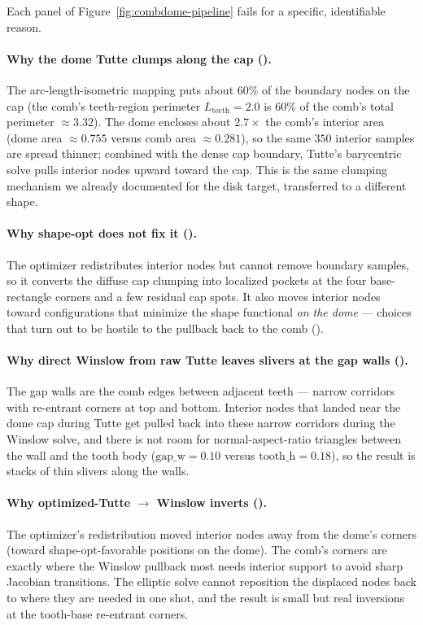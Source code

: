 \documentclass[11pt]{article}
\begin{document}
Each panel of Figure~\ref{fig:combdome-pipeline} fails for a
specific, identifiable reason.

\paragraph{Why the dome Tutte clumps along the cap
().}
The arc-length-isometric mapping puts about $60\%$ of the
boundary nodes on the cap (the comb's teeth-region perimeter
$L_{\mathrm{teeth}} = 2.0$ is $60\%$ of the comb's total
perimeter $\approx 3.32$). The dome encloses about $2.7\times$
the comb's interior area (dome area $\approx 0.755$ versus
comb area $\approx 0.281$), so the same $350$ interior samples
are spread thinner; combined with the dense cap boundary,
Tutte's barycentric solve pulls interior nodes upward toward
the cap. This is the same clumping mechanism we already
documented for the disk target, transferred to a different
shape.

\paragraph{Why shape-opt does not fix it
().}
The optimizer redistributes interior nodes but cannot remove
boundary samples, so it converts the diffuse cap clumping into
localized pockets at the four base-rectangle corners and a few
residual cap spots. It also moves interior nodes toward
configurations that minimize the shape functional \emph{on the
dome} --- choices that turn out to be hostile to the pullback
back to the comb ().

\paragraph{Why direct Winslow from raw Tutte leaves slivers at
the gap walls ().}
The gap walls are the comb edges between adjacent teeth ---
narrow corridors with re-entrant corners at top and bottom.
Interior nodes that landed near the dome cap during Tutte get
pulled back into these narrow corridors during the Winslow
solve, and there is not room for normal-aspect-ratio triangles
between the wall and the tooth body
($\mathrm{gap\_w} = 0.10$ versus $\mathrm{tooth\_h} = 0.18$),
so the result is stacks of thin slivers along the walls.

\paragraph{Why optimized-Tutte $\to$ Winslow inverts
().}
The optimizer's redistribution moved interior nodes away from
the dome's corners (toward shape-opt-favorable positions on the
dome). The comb's corners are exactly where the Winslow
pullback most needs interior support to avoid sharp Jacobian
transitions. The elliptic solve cannot reposition the
displaced nodes back to where they are needed in one shot, and
the result is small but real inversions at the tooth-base
re-entrant corners.
\end{document}
